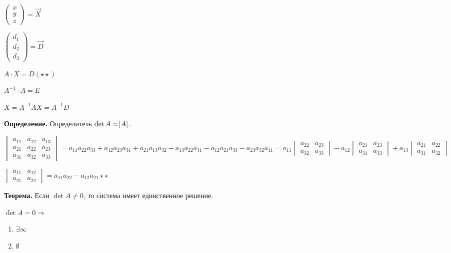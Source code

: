 \documentclass{article}
\begin{document}
    \( \begin{pmatrix}
        x\\
        y\\
        z
    \end{pmatrix} = \overrightarrow{X} \)

    \( \begin{pmatrix}
        d_1\\
        d_2\\
        d_3
    \end{pmatrix} = \overrightarrow{D} \)

    \( A \cdot X = D (\star\star) \)

    \( A^{-1} \cdot A = E \)

    \( X = A^{-1}AX = A^{-1}D \)

    \textbf{Определение.} Определитель \(\det A = \abs{A}\).
    
    \(\begin{vmatrix}
        a_{11} & a_{12} & a_{13}\\
        a_{21} & a_{22} & a_{23}\\
        a_{31} & a_{32} & a_{33}
    \end{vmatrix} = 
    a_{11}a_{22}a_{33} + a_{12}a_{23}a_{31} + a_{21}a_{13}a_{32} - a_{13}a_{22}a_{31} - a_{12}a_{21}a_{33} - a_{23}a_{32}a_{11} = a_{11} \begin{vmatrix}
        a_{22} & a_{23}\\
        a_{32} & a_{33}
    \end{vmatrix} - a_{12} \begin{vmatrix}
        a_{21} & a_{23}\\
        a_{31} & a_{33}
    \end{vmatrix} + a_{13} \begin{vmatrix}
        a_{21} & a_{22}\\
        a_{31} & a_{32}
    \end{vmatrix}\)

    \(\begin{vmatrix}
        a_{11} & a_{12}\\
        a_{21} & a_{22}
    \end{vmatrix} = a_{11}a_{22} - a_{12}a_{21} \star\star\)

    \textbf{Теорема.} Если \( \det A \neq 0 \), то система имеет единственное решение.

    \( \det A = 0 \Rightarrow \)
    \begin{enumerate}
        \item \( \exists \infty \)
        \item \( \emptyset \)
    \end{enumerate}
\end{document}
